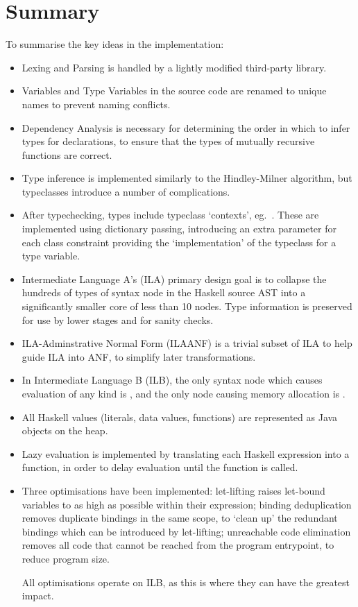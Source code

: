 \documentclass[dissertation.tex]{subfiles}
\begin{document}
\section{Summary}
{
    To summarise the key ideas in the implementation:

    \begin{itemize}
    \item Lexing and Parsing is handled by a lightly modified third-party library.
    \item Variables and Type Variables in the source code are renamed to unique names to prevent naming conflicts.
    \item
    {
        Dependency Analysis is necessary for determining the order in which to infer types for declarations, to ensure that the types of mutually recursive functions are correct.
    }
    \item
    {
        Type inference is implemented similarly to the Hindley-Milner algorithm, but typeclasses introduce a number of complications.
    }
    \item
    {
        After typechecking, types include typeclass `contexts', eg.\ . These are implemented using dictionary passing, introducing an extra parameter for each class constraint providing the `implementation' of the typeclass for a type variable.
    }
    \item
    {
        Intermediate Language A's (ILA) primary design goal is to collapse the hundreds of types of syntax node in the Haskell source AST into a significantly smaller core of less than 10 nodes. Type information is preserved for use by lower stages and for sanity checks.
    }
    \item
    {
        ILA-Adminstrative Normal Form (ILAANF) is a trivial subset of ILA to help guide ILA into ANF, to simplify later transformations.
    }
    \item
    {
        In Intermediate Language B (ILB), the only syntax node which causes evaluation of any kind is , and the only node causing memory allocation is .
    }
    \item All Haskell values (literals, data values, functions) are represented as Java objects on the heap.
    \item
    {
        Lazy evaluation is implemented by translating each Haskell expression into a function, in order to delay evaluation until the function is called.
    }
    \item
    {
        Three optimisations have been implemented: let-lifting raises let-bound variables to as high as possible within their expression; binding deduplication removes duplicate bindings in the same scope, to `clean up' the redundant bindings which can be introduced by let-lifting; unreachable code elimination removes all code that cannot be reached from the program entrypoint, to reduce program size.

        All optimisations operate on ILB, as this is where they can have the greatest impact.
    }
    \end{itemize}
}
\end{document}

